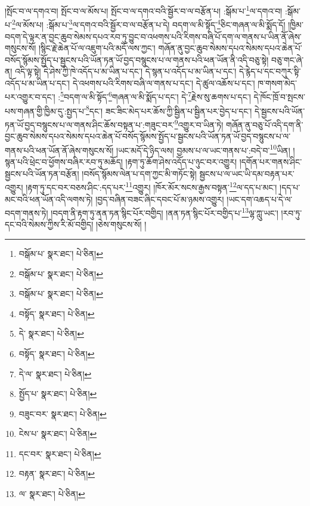 །སྤོང་བ་ལ་དགའ་བ། སྤོང་བ་ལ་མོས་པ། སྤོང་བ་ལ་དགའ་བའི་སྦྱོར་བ་ལ་བརྩོན་པ། :སྒོམ་པ་\footnote{བསྒོམ་པ་  སྣར་ཐང་།  པེ་ཅིན། }ལ་དགའ་བ། :སྒོམ་པ་\footnote{བསྒོམ་པ་  སྣར་ཐང་།  པེ་ཅིན། }ལ་མོས་པ། :སྒོམ་པ་\footnote{བསྒོམ་པ་  སྣར་ཐང་།  པེ་ཅིན། }ལ་དགའ་བའི་སྦྱོར་བ་ལ་བརྩོན་པ་དེ། བདག་ལ་མི་སྟོད་\footnote{བསྟོད་  སྣར་ཐང་།  པེ་ཅིན། }ཅིང་གཞན་ལ་མི་སྨོད་དོ། །ཁྱིམ་བདག་དེ་ལྟར་ན་བྱང་ཆུབ་སེམས་དཔའ་རབ་ཏུ་བྱུང་བ་འཕགས་པའི་རིགས་བཞི་པོ་དག་ལ་གནས་པ་ཡིན་ནོ་ཞེས་གསུངས་སོ། །སྙིང་རྗེ་ཆེན་པོ་ལ་འཇུག་པའི་མདོ་ལས་ཀྱང་། གཞོན་ནུ་བྱང་ཆུབ་སེམས་དཔའ་སེམས་དཔའ་ཆེན་པོ་བསོད་སྙོམས་སྤྱོད་པ་སྦྱངས་པའི་ཡོན་ཏན་ཡོ་བྱད་བསྙུངས་པ་ལ་གནས་པའི་ཕན་ཡོན་ནི་འདི་བཅུ་སྟེ། བཅུ་གང་ཞེ་ན། འདི་ལྟ་སྟེ། དེ་ཤེས་ཀྱི་ཁེ་འདོད་པ་མ་ཡིན་པ་དང་། དེ་སྙན་པ་འདོད་པ་མ་ཡིན་པ་དང་། དེ་རྙེད་པ་དང་བཀུར་སྟི་འདོད་པ་མ་ཡིན་པ་དང་། དེ་འཕགས་པའི་རིགས་བཞི་ལ་གནས་པ་དང་། དེ་ཚུལ་འཆོས་པ་དང་། ཁ་གསག་མེད་པར་འགྱུར་བ་དང་། :\footnote{དེ་  སྣར་ཐང་།  པེ་ཅིན། }བདག་ལ་མི་སྟོད་\footnote{བསྟོད་  སྣར་ཐང་།  པེ་ཅིན། }གཞན་ལ་མི་སྨོད་པ་དང་། དེ་\footnote{དེ་ལ་  སྣར་ཐང་།  པེ་ཅིན། }རྗེས་སུ་ཆགས་པ་དང་། དེ་ཁོང་ཁྲོ་བ་སྤངས་པས་གཞན་གྱི་ཁྱིམ་དུ་:སྤྱད་པ་\footnote{སྤྱོད་པ་  སྣར་ཐང་།  པེ་ཅིན། }དང་། ཟང་ཟིང་མེད་པར་ཆོས་ཀྱི་སྦྱིན་པ་སྦྱིན་པར་བྱེད་པ་དང་། དེ་སྦྱངས་པའི་ཡོན་ཏན་ཡོ་བྱད་བསྙུངས་པ་ལ་གནས་ཤིང་ཆོས་བསྟན་པ་:གཟུང་བར་\footnote{བཟུང་བར་  སྣར་ཐང་།  པེ་ཅིན། }འགྱུར་བ་ཡིན་ཏེ། གཞོན་ནུ་བཅུ་པོ་འདི་དག་ནི་བྱང་ཆུབ་སེམས་དཔའ་སེམས་དཔའ་ཆེན་པོ་བསོད་སྙོམས་སྤྱོད་པ་སྦྱངས་པའི་ཡོན་ཏན་ཡོ་བྱད་བསྙུངས་པ་ལ་གནས་པའི་ཕན་ཡོན་ནོ་ཞེས་གསུངས་སོ། །ཡང་མདོ་དེ་ཉིད་ལས། བྱམས་པ་ལ་ཡང་གནས་པ་:བདེ་བ་\footnote{ངེས་པ་  སྣར་ཐང་།  པེ་ཅིན། }ཡིན། །སྙན་པའི་ཕྲེང་བ་ཕྱོགས་བཞིར་རབ་ཏུ་མཆོད། །རྟག་ཏུ་ཆོག་ཤེས་འདོད་པ་ཉུང་བར་འགྱུར། །དགོན་པར་གནས་ཤིང་སྦྱངས་པའི་ཡོན་ཏན་བརྩོན། །བསོད་སྙོམས་ལེན་པ་དག་ཀྱང་མི་གཏོང་སྟེ། སྦྱངས་པ་ལ་ཡང་ཡི་དམ་བརྟན་པར་འགྱུར། །རྟག་ཏུ་དང་བར་བཅས་ཤིང་:དད་པར་\footnote{དང་བར་  སྣར་ཐང་།  པེ་ཅིན། }འགྱུར། །ཁོར་མོར་སངས་རྒྱས་བསྟན་\footnote{བརྟན་  སྣར་ཐང་།  པེ་ཅིན། }ལ་དད་པ་མང་། །དད་པ་མང་བའི་ཕན་ཡོན་འདི་ལགས་ཏེ། །བྱད་བཞིན་བཟང་ཞིང་དབང་པོ་མ་ཉམས་འགྱུར། །ཡང་དག་འཆད་པ་དེ་ལ་བདག་གནས་ཏེ། །བདག་ནི་རྟག་ཏུ་ནན་ཏན་སྙིང་པོར་བགྱིད། །ནན་ཏན་སྙིང་པོར་བགྱིད་པ་\footnote{ལ་  སྣར་ཐང་།  པེ་ཅིན། }ལྷ་ཀླུ་ཡང་། །རབ་ཏུ་དང་བའི་སེམས་ཀྱིས་རི་མོ་བགྱིད། །ཅེས་གསུངས་སོ། །
